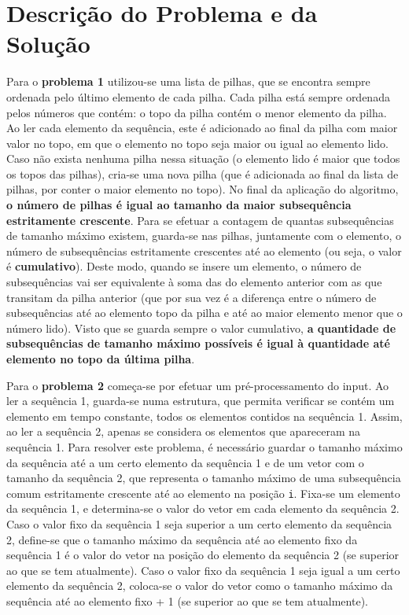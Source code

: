 \documentclass[12pt,a4paper]{article}
\begin{document}
  \section{Descrição do Problema e da Solução}

  Para o \textbf{problema 1} utilizou-se uma lista de pilhas, que se encontra sempre ordenada pelo último elemento de cada pilha.
  Cada pilha está sempre ordenada pelos números que contém: o topo da pilha contém o menor elemento da pilha.
  Ao ler cada elemento da sequência, este é adicionado ao final da pilha com maior valor no topo, em que o elemento no topo seja maior ou igual ao elemento lido.
  Caso não exista nenhuma pilha nessa situação (o elemento lido é maior que todos os topos das pilhas), cria-se uma nova pilha (que é adicionada ao final da lista de pilhas, por conter o maior elemento no topo).
  No final da aplicação do algoritmo, \textbf{o número de pilhas é igual ao tamanho da maior subsequência estritamente crescente}.
  Para se efetuar a contagem de quantas subsequências de tamanho máximo existem, guarda-se nas pilhas, juntamente com o elemento, o número de subsequências estritamente crescentes até ao elemento (ou seja, o valor é \textbf{cumulativo}).
  Deste modo, quando se insere um elemento, o número de subsequências vai ser equivalente à soma das do elemento anterior com as que transitam da pilha anterior (que por sua vez é a diferença entre o número de subsequências até ao elemento topo da pilha e até ao maior elemento menor que o número lido).
  Visto que se guarda sempre o valor cumulativo, \textbf{a quantidade de subsequências de tamanho máximo possíveis é igual à quantidade até elemento no topo da última pilha}.

  Para o \textbf{problema 2} começa-se por efetuar um pré-processamento do input.
  Ao ler a sequência 1, guarda-se numa estrutura, que permita verificar se contém um elemento em tempo constante, todos os elementos contidos na sequência 1.
  Assim, ao ler a sequência 2, apenas se considera os elementos que apareceram na sequência 1.
  Para resolver este problema, é necessário guardar o tamanho máximo da sequência até a um certo elemento da sequência 1 e de um vetor com o tamanho da sequência 2, que representa o tamanho máximo de uma subsequência comum estritamente crescente até ao elemento na posição \texttt{i}.
  Fixa-se um elemento da sequência 1, e determina-se o valor do vetor em cada elemento da sequência 2.
  Caso o valor fixo da sequência 1 seja superior a um certo elemento da sequência 2, define-se que o tamanho máximo da sequência até ao elemento fixo da sequência 1 é o valor do vetor na posição do elemento da sequência 2 (se superior ao que se tem atualmente).
  Caso o valor fixo da sequência 1 seja igual a um certo elemento da sequência 2, coloca-se o valor do vetor como o tamanho máximo da sequência até ao elemento fixo + 1 (se superior ao que se tem atualmente).
\end{document}
